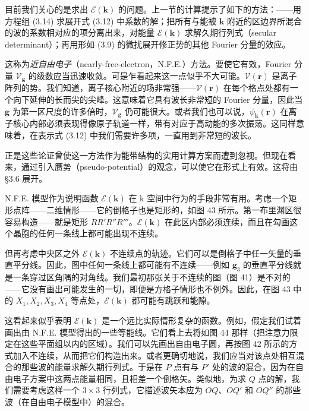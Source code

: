 目前我们关心的是求出 $\mathcal{E}(\mathbf{k})$ 的问题。上一节的计算提示了如下的方法：——用方程组 (3.14) 求展开式 (3.12) 中系数的解；把所有与能被 $\mathbf{k}$ 附近的区边界所混合的波的系数相对应的项分离出来，对能量 $\mathcal{E}(\mathbf{k})$ 求解久期行列式（secular determinant）；再用形如 (3.9) 的微扰展开修正势的其他 Fourier 分量的效应。

这称为\emph{近自由电子}（nearly-free-electron，N.F.E.）方法。要使它有效，Fourier 分量 $\mathcal{V}_{\mathbf{g}}$ 的级数应当迅速收敛。可是乍看起来这一点似乎不大可能。$\mathcal{V}(\mathbf{r})$ 是离子阵列的势。我们知道，离子核心附近的场非常强——$\mathcal{V}(\mathbf{r})$ 在每个格点处都有一个向下延伸的长而尖的尖峰。这意味着它具有波长非常短的 Fourier 分量，因此当 $\mathbf{g}$ 为第一区尺度的许多倍时，$\mathcal{V}_{\mathbf{g}}$ 仍可能很大。或者我们也可以说，$\psi_{\mathbf{k}}(\mathbf{r})$ 在离子核心内部必须表现得像原子轨道一样，带有对应于高动能的多次振荡。这同样意味着，在表示式 (3.12) 中我们需要许多项，一直用到非常短的波长。

正是这些论证曾使这一方法作为能带结构的实用计算方案而遭到忽视。但现在看来，通过引入赝势（pseudo-potential）的观念，可以使它在形式上有效。这将由 §3.6 展开。

N.F.E. 模型作为说明函数 $\mathcal{E}(\mathbf{k})$ 在 k 空间中行为的手段非常有用。考虑一个矩形点阵——二维情形——它的倒格子也是矩形的，如图 43 所示。第一布里渊区很容易构造——就是矩形 $RR'R''R'''$。$\mathcal{E}(\mathbf{k})$ 在此区内部必须连续，而且在勾画这个晶胞的任何一条线上都可能出现不连续。

但再考虑中央区之外 $\mathcal{E}(\mathbf{k})$ 不连续点的轨迹。它们可以是倒格子中任一矢量的垂直平分线。因此，图中任何一条线上都可能有不连续——例如 $\mathbf{g}_{3}$ 的垂直平分线就是一条穿过区角隅的对角线。我们最初那张关于不连续的图（图 41）是不对的——它没有画出可能发生的一切，即便是方格子情形也不例外。因此，在图 43 中的 $X_{1},X_{2},X_{3},X_{4}$ 等点处，$\mathcal{E}(\mathbf{k})$ 都可能有跳跃和能隙。


这看起来似乎表明 $\mathcal{E}(\mathbf{k})$ 是一个远比实际情形复杂的函数。例如，假定我们试着画出由 N.F.E. 模型得出的一些等能线。它们看上去将如图 44 那样（把注意力限定在这些平面组以内的区域）。我们可以先画出自由电子圆，再按图 42 所示的方式加入不连续，从而把它们构造出来。或者更确切地说，我们应当对该点处相互混合的那些波的能量求解久期行列式。于是在 $P$ 点有与 $P'$ 处的波的混合，因为在自由电子方案中这两点能量相同，且相差一个倒格矢。类似地，为求 $Q$ 点的解，我们需要考虑这样一个 $3\times 3$ 行列式，它描述波矢本应为 $OQ$、$OQ'$ 和 $OQ''$ 的那些波（在自由电子模型中）的混合。

